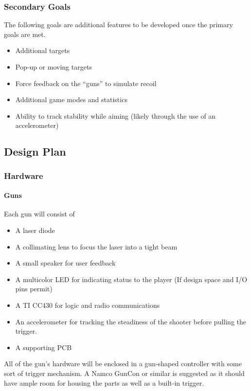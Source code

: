 \documentclass{article}
\begin{document}
\subsubsection{Secondary Goals}

The following goals are additional features to be developed once the primary goals are met.

\begin{itemize}
\item Additional targets
\item Pop-up or moving targets
\item Force feedback on the ``guns'' to simulate recoil
\item Additional game modes and statistics
\item Ability to track stability while aiming (likely through the use of an accelerometer)
\end{itemize}

\subsection{Design Plan}

\subsubsection{Hardware}

\paragraph{Guns}

Each gun will consist of
\begin{itemize}
\item A laser diode
\item A collimating lens to focus the laser into a tight beam
\item A small speaker for user feedback
\item A multicolor LED for indicating status to the player (If design space and I/O pins permit)
\item A TI CC430 for logic and radio communications
\item An accelerometer for tracking the steadiness of the shooter before pulling the trigger.
\item A supporting PCB
\end{itemize}

All of the gun's hardware will be enclosed in a gun-shaped controller with some sort of trigger mechanism.
A Namco GunCon or similar is suggested as it should have ample room for housing the parts as well as a built-in trigger.
\end{document}
